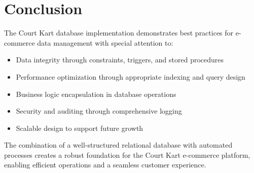 \documentclass[13pt,a4paper]{article}
\begin{document}
\section{Conclusion}

The Court Kart database implementation demonstrates best practices for e-commerce data management with special attention to:

\begin{itemize}
	\item Data integrity through constraints, triggers, and stored procedures
	\item Performance optimization through appropriate indexing and query design
	\item Business logic encapsulation in database operations
	\item Security and auditing through comprehensive logging
	\item Scalable design to support future growth
\end{itemize}

The combination of a well-structured relational database with automated processes creates a robust foundation for the Court Kart e-commerce platform, enabling efficient operations and a seamless customer experience.
\end{document}
